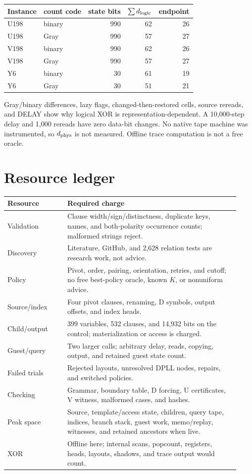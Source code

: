 \documentclass[11pt]{article}
\begin{document}
\begin{center}
\begin{tabular}{llrrr}
\toprule
Instance & count code & state bits & $\sum d_{\rm logic}$ & endpoint\\
\midrule
U198 & binary & 990 & 62 & 26\\
U198 & Gray & 990 & 57 & 27\\
V198 & binary & 990 & 62 & 26\\
V198 & Gray & 990 & 57 & 27\\
Y6 & binary & 30 & 61 & 19\\
Y6 & Gray & 30 & 51 & 21\\
\bottomrule
\end{tabular}
\end{center}
Gray/binary differences, lazy flags, changed-then-restored cells, source rereads, and DELAY show why logical XOR is representation-dependent.  A 10,000-step delay and 1,000 rereads have zero data-bit changes.  No native tape machine was instrumented, so $d_{\rm phys}$ is not measured.  Offline trace computation is not a free oracle.

\section{Resource ledger}
\begin{longtable}{p{0.24\linewidth}p{0.69\linewidth}}
\toprule
Resource & Required charge\\
\midrule
\endhead
Validation & Clause width/sign/distinctness, duplicate keys, names, and both-polarity occurrence counts; malformed strings reject.\\
Discovery & Literature, GitHub, and 2,628 relation tests are research work, not advice.\\
Policy & Pivot, order, pairing, orientation, retries, and cutoff; no free best-policy oracle, known $K$, or nonuniform advice.\\
Source/index & Four pivot clauses, renaming, D symbols, output offsets, and index heads.\\
Child/output & 399 variables, 532 clauses, and 14,932 bits on the control; materialization or access is charged.\\
Guest/query & Two larger calls; arbitrary delay, reads, copying, output, and retained guest state count.\\
Failed trials & Rejected layouts, unresolved DPLL nodes, repairs, and switched policies.\\
Checking & Grammar, boundary table, D forcing, U certificates, V witness, malformed cases, and hashes.\\
Peak space & Source, template/access state, children, query tape, indices, branch stack, guest work, memo/replay, witnesses, and retained ancestors when live.\\
XOR & Offline here; internal scans, popcount, registers, heads, layouts, shadows, and trace output would count.\\
\bottomrule
\end{longtable}
\end{document}

